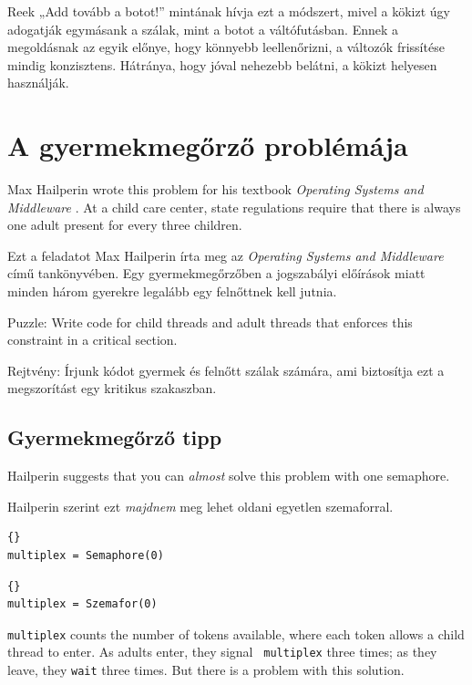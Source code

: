 \documentclass{book}
\newcommand{\clearemptydoublepage}{\newpage\cleardoublepage}
\begin{document}
Reek „Add tovább a botot!” mintának hívja ezt a módszert, mivel
a kökizt úgy adogatják egymásank a szálak, mint a botot a
váltófutásban.
Ennek a megoldásnak az egyik előnye, hogy könnyebb leellenőrizni,
a változók frissítése mindig konzisztens. Hátránya, hogy
jóval nehezebb belátni, a kökizt helyesen használják.

\section{A gyermekmegőrző problémája}

Max Hailperin wrote this problem for his textbook {\em Operating
Systems and Middleware} \cite{hailperin}.  At a child care center,
state regulations require that there is always one adult present for
every three children.

Ezt a feladatot Max Hailperin írta meg az {\em Operating
Systems and Middleware} \cite{hailperin} című tankönyvében.
Egy gyermekmegőrzőben a jogszabályi előírások miatt minden
három gyerekre legalább egy felnőttnek kell jutnia.

Puzzle: Write code for child threads and adult threads that enforces
this constraint in a critical section.

Rejtvény: Írjunk kódot gyermek és felnőtt szálak számára, ami
biztosítja ezt a megszorítást egy kritikus szakaszban.

\clearemptydoublepage
\subsection{Gyermekmegőrző tipp}

Hailperin suggests that you can {\em almost} solve this problem
with one semaphore.

Hailperin szerint ezt {\em majdnem} meg lehet oldani egyetlen szemaforral.

\begin{lstlisting}[title={Child care hint}]{}
multiplex = Semaphore(0)
\end{lstlisting}

\begin{lstlisting}[title={Gyermekmegőrző tipp}]{}
multiplex = Szemafor(0)
\end{lstlisting}

{\tt multiplex} counts the number of tokens available, where each token
allows a child thread to enter.  As adults enter, they signal {\tt
multiplex} three times; as they leave, they {\tt wait} three times.
But there is a problem with this solution.
\end{document}
